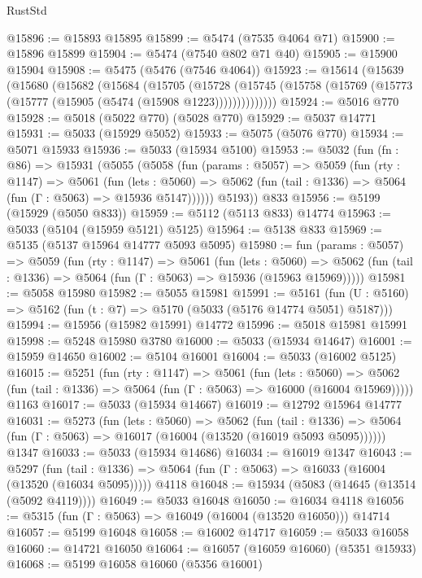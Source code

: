 \begin{lexlean}{RustStd}
\begin{coremodule}
@15896 := @15893 @15895
@15899 := @5474 (@7535 @4064 @71)
@15900 := @15896 @15899
@15904 := @5474 (@7540 @802 @71 @40)
@15905 := @15900 @15904
@15908 := @5475 (@5476 (@7546 @4064))
@15923 := @15614
    (@15639
      (@15680
        (@15682
          (@15684
            (@15705
              (@15728
                (@15745 (@15758 (@15769 (@15773 (@15777 (@15905 (@5474 (@15908 @1223))))))))))))))
@15924 := @5016 @770
@15928 := @5018 (@5022 @770) (@5028 @770)
@15929 := @5037 @14771
@15931 := @5033 (@15929 @5052)
@15933 := @5075 (@5076 @770)
@15934 := @5071 @15933
@15936 := @5033 (@15934 @5100)
@15953 := @5032
    (fun (fn : @86) =>
    @15931
      (@5055
        (@5058
          (fun (params : @5057) =>
          @5059
            (fun (rty : @1147) =>
            @5061
              (fun (lets : @5060) =>
              @5062 (fun (tail : @1336) => @5064 (fun (Γ : @5063) => @15936 @5147))))))
        @5193))
    @833
@15956 := @5199 (@15929 (@5050 @833))
@15959 := @5112 (@5113 @833) @14774
@15963 := @5033 (@5104 (@15959 @5121) @5125)
@15964 := @5138 @833
@15969 := @5135 (@5137 @15964 @14777 @5093 @5095)
@15980 := fun (params : @5057) =>
  @5059
    (fun (rty : @1147) =>
    @5061
      (fun (lets : @5060) =>
      @5062 (fun (tail : @1336) => @5064 (fun (Γ : @5063) => @15936 (@15963 @15969)))))
@15981 := @5058 @15980
@15982 := @5055 @15981
@15991 := @5161
    (fun (U : @5160) => @5162 (fun (t : @7) => @5170 (@5033 (@5176 @14774 @5051) @5187)))
@15994 := @15956 (@15982 @15991) @14772
@15996 := @5018 @15981 @15991
@15998 := @5248 @15980 @3780
@16000 := @5033 (@15934 @14647)
@16001 := @15959 @14650
@16002 := @5104 @16001
@16004 := @5033 (@16002 @5125)
@16015 := @5251
    (fun (rty : @1147) =>
    @5061
      (fun (lets : @5060) =>
      @5062 (fun (tail : @1336) => @5064 (fun (Γ : @5063) => @16000 (@16004 @15969)))))
    @1163
@16017 := @5033 (@15934 @14667)
@16019 := @12792 @15964 @14777
@16031 := @5273
    (fun (lets : @5060) =>
    @5062
      (fun (tail : @1336) =>
      @5064 (fun (Γ : @5063) => @16017 (@16004 (@13520 (@16019 @5093 @5095))))))
    @1347
@16033 := @5033 (@15934 @14686)
@16034 := @16019 @1347
@16043 := @5297
    (fun (tail : @1336) => @5064 (fun (Γ : @5063) => @16033 (@16004 (@13520 (@16034 @5095)))))
    @4118
@16048 := @15934 (@5083 (@14645 (@13514 (@5092 @4119))))
@16049 := @5033 @16048
@16050 := @16034 @4118
@16056 := @5315 (fun (Γ : @5063) => @16049 (@16004 (@13520 @16050))) @14714
@16057 := @5199 @16048
@16058 := @16002 @14717
@16059 := @5033 @16058
@16060 := @14721 @16050
@16064 := @16057 (@16059 @16060) (@5351 @15933)
@16068 := @5199 @16058 @16060 (@5356 @16001)

\end{coremodule}
\end{lexlean}
